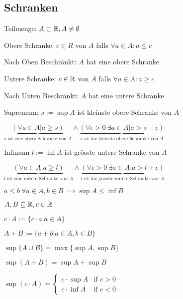 \subsection{Schranken}
\begin{compactdesc}
    \item[Teilmenge:] $A \subset \mathbb{R}, A \neq \emptyset$
    \item[Obere Schranke:] $c \in R$ von $A$ falls  $\forall a \in A: a \le c$
    \item[Nach Oben Beschränkt:] $A$ hat eine obere Schranke
    \item[Untere Schranke:] $c \in \mathbb{R}$ von $A$ falls $\forall a \in A: a \ge c$
    \item[Nach Unten Beschränkt:] $A$ hat eine untere Schranke
    \item[Supremum:] $s:= \sup A$ ist kleinste obere Schranke von $A$
    \item $\underbrace{\left( \forall a \in  A | a \ge  s \right)}_{s \text{ ist eine obere Schranke von } A} \wedge \underbrace{\left( \forall  \epsilon > 0 \ \exists a \in A | a > s - \epsilon \right)}_{s \text{ ist die kleinste obere Schranke von } A}  $
    \item[Infimum] $l:= \inf A$ ist grösste untere Schranke von $A$
    \item $\underbrace{\left( \forall a \in  A | a \ge  l \right)}_{l \text{ ist eine untere Schranke von } A} \wedge \underbrace{\left( \forall  \epsilon > 0 \ \exists a \in A | a > l + \epsilon \right)}_{l \text{ ist die grösste untere Schranke von } A}  $
\end{compactdesc}

\begin{compactitem}
    \item $a \le b \ \forall a \in A, b \in B \implies \sup A \le \inf B$
    \item $A, B \subseteq \mathbb{R}, c \in \mathbb{R}$
        \begin{compactitem}
            \item $c \cdot A := \{c \cdot  a | a \in  A\} $
            \item $A + B := \{a + b | a \in A, b \in B\} $
        \end{compactitem}
    \item $\sup \{A \cup B\} = \max \{\sup A, \sup B\}  $
    \item $\sup \left( A + B \right) = \sup A + \sup B $
    \item $\sup \left( c \cdot A \right) = \begin{cases}
        c \cdot \sup A & \text{if } c > 0\\
        c \cdot \inf A & \text{if } c < 0
    \end{cases} $
\end{compactitem}

